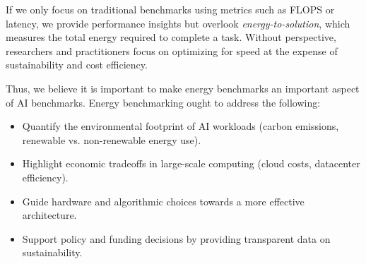 If we only focus on traditional benchmarks using metrics such as FLOPS or latency, we provide performance insights but overlook {\em energy-to-solution}, which measures the total energy required to complete a task. Without perspective, researchers and practitioners focus on optimizing for speed at the expense of sustainability and cost efficiency. 

Thus, we believe it is important to make energy benchmarks an important aspect of AI benchmarks. Energy benchmarking ought to address the following:

\begin{itemize}
     \item Quantify the environmental footprint of AI workloads (carbon emissions, renewable vs. non-renewable energy use).
     \item Highlight economic tradeoffs in large-scale computing (cloud costs, datacenter efficiency). 
     \item Guide hardware and algorithmic choices towards a more effective architecture.
     \item Support policy and funding decisions by providing transparent data on sustainability. 
 \end{itemize}

